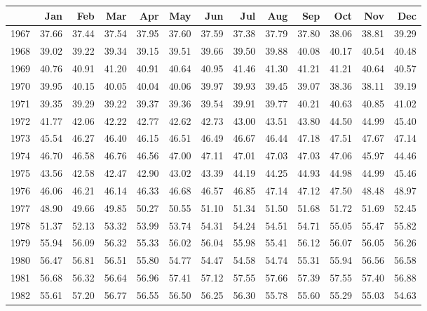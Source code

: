 \begin{longtable}{rrrrrrrrrrrrr}
  \hline
 & Jan & Feb & Mar & Apr & May & Jun & Jul & Aug & Sep & Oct & Nov & Dec \\ 
  \hline
1967 & 37.66 & 37.44 & 37.54 & 37.95 & 37.60 & 37.59 & 37.38 & 37.79 & 37.80 & 38.06 & 38.81 & 39.29 \\ 
  1968 & 39.02 & 39.22 & 39.34 & 39.15 & 39.51 & 39.66 & 39.50 & 39.88 & 40.08 & 40.17 & 40.54 & 40.48 \\ 
  1969 & 40.76 & 40.91 & 41.20 & 40.91 & 40.64 & 40.95 & 41.46 & 41.30 & 41.21 & 41.21 & 40.64 & 40.57 \\ 
  1970 & 39.95 & 40.15 & 40.05 & 40.04 & 40.06 & 39.97 & 39.93 & 39.45 & 39.07 & 38.36 & 38.11 & 39.19 \\ 
  1971 & 39.35 & 39.29 & 39.22 & 39.37 & 39.36 & 39.54 & 39.91 & 39.77 & 40.21 & 40.63 & 40.85 & 41.02 \\ 
  1972 & 41.77 & 42.06 & 42.22 & 42.77 & 42.62 & 42.73 & 43.00 & 43.51 & 43.80 & 44.50 & 44.99 & 45.40 \\ 
  1973 & 45.54 & 46.27 & 46.40 & 46.15 & 46.51 & 46.49 & 46.67 & 46.44 & 47.18 & 47.51 & 47.67 & 47.14 \\ 
  1974 & 46.70 & 46.58 & 46.76 & 46.56 & 47.00 & 47.11 & 47.01 & 47.03 & 47.03 & 47.06 & 45.97 & 44.46 \\ 
  1975 & 43.56 & 42.58 & 42.47 & 42.90 & 43.02 & 43.39 & 44.19 & 44.25 & 44.93 & 44.98 & 44.99 & 45.46 \\ 
  1976 & 46.06 & 46.21 & 46.14 & 46.33 & 46.68 & 46.57 & 46.85 & 47.14 & 47.12 & 47.50 & 48.48 & 48.97 \\ 
  1977 & 48.90 & 49.66 & 49.85 & 50.27 & 50.55 & 51.10 & 51.34 & 51.50 & 51.68 & 51.72 & 51.69 & 52.45 \\ 
  1978 & 51.37 & 52.13 & 53.32 & 53.99 & 53.74 & 54.31 & 54.24 & 54.51 & 54.71 & 55.05 & 55.47 & 55.82 \\ 
  1979 & 55.94 & 56.09 & 56.32 & 55.33 & 56.02 & 56.04 & 55.98 & 55.41 & 56.12 & 56.07 & 56.05 & 56.26 \\ 
  1980 & 56.47 & 56.81 & 56.51 & 55.80 & 54.77 & 54.47 & 54.58 & 54.74 & 55.31 & 55.94 & 56.56 & 56.58 \\ 
  1981 & 56.68 & 56.32 & 56.64 & 56.96 & 57.41 & 57.12 & 57.55 & 57.66 & 57.39 & 57.55 & 57.40 & 56.88 \\ 
  1982 & 55.61 & 57.20 & 56.77 & 56.55 & 56.50 & 56.25 & 56.30 & 55.78 & 55.60 & 55.29 & 55.03 & 54.63 \\ 

\end{longtable}
